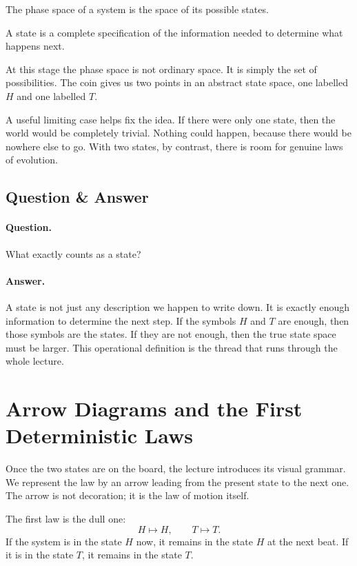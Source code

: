 \begin{definition}
The phase space of a system is the space of its possible states.
\end{definition}

\begin{definition}
A state is a complete specification of the information needed to determine what happens next.
\end{definition}

At this stage the phase space is not ordinary space. It is simply the set of possibilities. The coin gives us two points in an abstract state space, one labelled \(H\) and one labelled \(T\).

A useful limiting case helps fix the idea. If there were only one state, then the world would be completely trivial. Nothing could happen, because there would be nowhere else to go. With two states, by contrast, there is room for genuine laws of evolution.

\subsection{Question \& Answer}

\paragraph{Question.} What exactly counts as a state?

\paragraph{Answer.} A state is not just any description we happen to write down. It is exactly enough information to determine the next step. If the symbols \(H\) and \(T\) are enough, then those symbols are the states. If they are not enough, then the true state space must be larger. This operational definition is the thread that runs through the whole lecture.

\section{Arrow Diagrams and the First Deterministic Laws}

Once the two states are on the board, the lecture introduces its visual grammar. We represent the law by an arrow leading from the present state to the next one. The arrow is not decoration; it is the law of motion itself.

The first law is the dull one:
\begin{equation}
H \mapsto H,\qquad T \mapsto T.
\end{equation}
If the system is in the state \(H\) now, it remains in the state \(H\) at the next beat. If it is in the state \(T\), it remains in the state \(T\).

